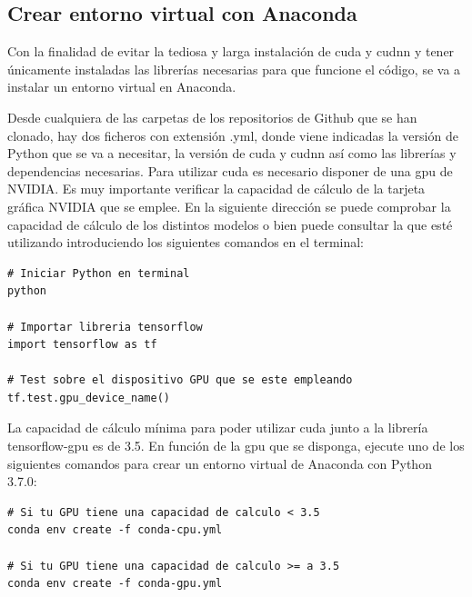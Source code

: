 \subsection{Crear entorno virtual con Anaconda}
\label{subsec:creacion-entorno}

Con la finalidad de evitar la tediosa y larga instalación de \gls{cuda} y \gls{cudnn} y tener únicamente instaladas las librerías necesarias para que funcione el código, se va a instalar un entorno virtual en Anaconda.

Desde cualquiera de las carpetas de los repositorios de Github que se han clonado, hay dos ficheros con extensión .yml, donde viene indicadas la versión de Python que se va a necesitar, la versión de \gls{cuda} y \gls{cudnn} así como las librerías y dependencias necesarias. Para utilizar \gls{cuda} es necesario disponer de una \gls{gpu} de NVIDIA. Es muy importante verificar la capacidad de cálculo de la tarjeta gráfica NVIDIA que se emplee. En la siguiente dirección \cite{cuda-gpus} se puede comprobar la capacidad de cálculo de los distintos modelos o bien puede consultar la que esté utilizando introduciendo los siguientes comandos en el terminal:

\begin{lstlisting}[language=iPython,caption=Comprobar capacidad computación de la GPU,captionpos=b,label={lst:check-compute-capability}]
# Iniciar Python en terminal
python

# Importar libreria tensorflow
import tensorflow as tf

# Test sobre el dispositivo GPU que se este empleando
tf.test.gpu_device_name()
\end{lstlisting}

La capacidad de cálculo mínima para poder utilizar \gls{cuda} junto a la librería tensorflow-gpu es de 3.5. En función de la \gls{gpu} que se disponga, ejecute uno de los siguientes comandos para crear un entorno virtual de Anaconda con Python 3.7.0:

\vspace{0.5cm}

\begin{lstlisting}[language=iPython,caption=Creación entorno virtual en Anaconda,captionpos=b,label={lst:crear-env}]
# Si tu GPU tiene una capacidad de calculo < 3.5
conda env create -f conda-cpu.yml

# Si tu GPU tiene una capacidad de calculo >= a 3.5
conda env create -f conda-gpu.yml
\end{lstlisting}

